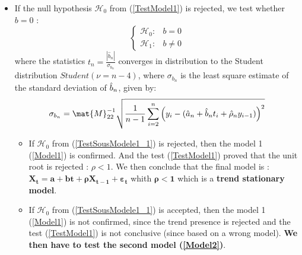 \begin{itemize}
\item If the null hypothesis  $\mathcal{H}_0$  from (\ref{TestModel1}) is rejected, we test whether $b=0$  :
  \begin{equation}\label{TestSousModele1_1}
    \left\{
    \begin{array}{lr}
      \mathcal{H}_0 :  & b = 0 \\
      \mathcal{H}_1 : & b \neq 0
    \end{array}
    \right.
  \end{equation}
  where the statistics $t_n = \frac{|\hat{b}_n|}{\sigma_{b_n}}$ converges in distribution to the Student distribution $Student(\nu=n-4)$, where $\sigma_{b_n}$ is the least square estimate of the standard deviation of $\Hat{b}_n$, given by:
  \begin{equation}
    \sigma_{b_n}=\mat{M}^{-1}_{22}\sqrt{\frac{1}{n-1}\sum_{i=2}^n\left(y_{i}-(\hat{a}_n+\hat{b}_nt_i+\hat{\rho}_ny_{i-1})\right)^2}
  \end{equation}

  \begin{itemize}
  \item If $\mathcal{H}_0$  from (\ref{TestSousModele1_1}) is rejected, then the model 1 (\ref{Model1}) is confirmed.  And the  test (\ref{TestModel1}) proved that the unit root is rejected : $ \rho < 1$. We then conclude that the final model is : $\boldsymbol{X_t = a + bt +  \rho X_{t-1} + \varepsilon_{t}}$ whith $\boldsymbol{\rho < 1}$ which is a {\bf trend stationary model}.
  \item  If $\mathcal{H}_0$  from (\ref{TestSousModele1_1}) is accepted, then the model 1 (\ref{Model1}) is not confirmed, since the trend presence is rejected and the test (\ref{TestModel1}) is not conclusive (since based on a wrong model). {\bf We then have to test the second model (\ref{Model2})}.
  \end{itemize}



\end{itemize}
